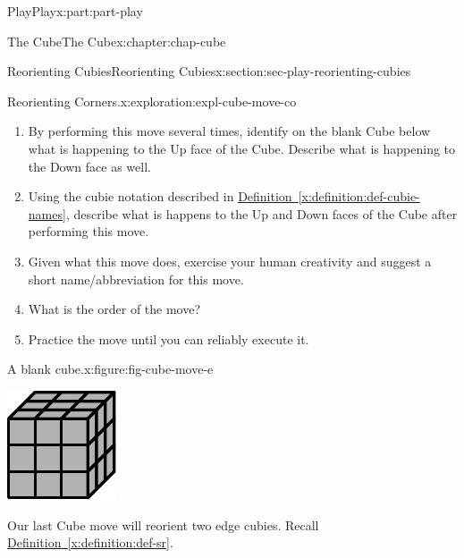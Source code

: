 \documentclass[oneside,10pt,]{book}
\newcommand{\xreffont}{\relax}
\numberwithin{equation}{section}
\begin{document}
\begin{partptx}{Play}{}{Play}{}{}{x:part:part-play}
\begin{chapterptx}{The Cube}{}{The Cube}{}{}{x:chapter:chap-cube}
\begin{sectionptx}{Reorienting Cubies}{}{Reorienting Cubies}{}{}{x:section:sec-play-reorienting-cubies}
\begin{exploration}{Reorienting Corners.}{x:exploration:expl-cube-move-co}
\begin{enumerate}
\item{}By performing this move several times, identify on the blank Cube below what is happening to the Up face of the Cube. Describe what is happening to the Down face as well.%
\item{}Using the cubie notation described in \hyperref[x:definition:def-cubie-names]{Definition~{\xreffont\ref{x:definition:def-cubie-names}}}, describe what is happens to the Up and Down faces of the Cube after performing this move.%
\item{}Given what this move does, exercise your human creativity and suggest a short name\slash{}abbreviation for this move.%
\item{}What is the order of the move?%
\item{}Practice the move until you can reliably execute it.%
\end{enumerate}
\begin{figureptx}{A blank cube.}{x:figure:fig-cube-move-e}{}%
\begin{image}{0.25}{0.5}{0.25}%
\includegraphics[width=\linewidth]{./images/grey_cube.pdf}
\end{image}%
\tcblower
\end{figureptx}%
\end{exploration}%
Our last Cube move will reorient two edge cubies. Recall \hyperref[x:definition:def-sr]{Definition~{\xreffont\ref{x:definition:def-sr}}}.%

\end{sectionptx}
\end{chapterptx}
\end{partptx}
\end{document}

